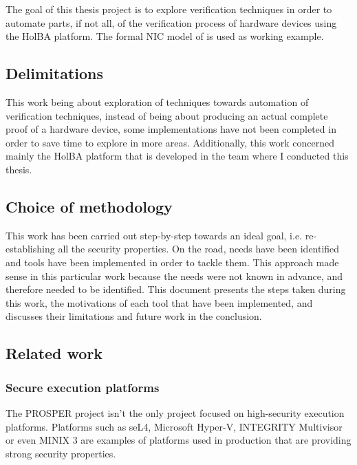 \documentclass[10pt,a4paper]{article}
\begin{document}
\begin{multicols}{2}
The goal of this thesis project is to explore verification techniques in order to automate parts, if not all, of the verification process of hardware devices using the HolBA platform. The formal {NIC} model of \cite{haglund_formal_2016} is used as working example.

\subsection{Delimitations}

This work being about exploration of techniques towards automation of verification techniques, instead of being about producing an actual complete proof of a hardware device, some implementations have not been completed in order to save time to explore in more areas. Additionally, this work concerned mainly the HolBA platform that is developed in the team where I conducted this thesis.

\subsection{Choice of methodology}

This work has been carried out step-by-step towards an ideal goal, i.e. re-establishing all the security properties. On the road, needs have been identified and tools have been implemented in order to tackle them. This approach made sense in this particular work because the needs were not known in advance, and therefore needed to be identified. This document presents the steps taken during this work, the motivations of each tool that have been implemented, and discusses their limitations and future work in the conclusion.

\subsection{Related work}

\subsubsection{Secure execution platforms}

The {PROSPER} project isn't the only project focused on high-security execution platforms. Platforms such as seL4, Microsoft Hyper-V, INTEGRITY Multivisor or even MINIX 3 are examples of platforms used in production that are providing strong security properties.


\end{multicols}
\end{document}
